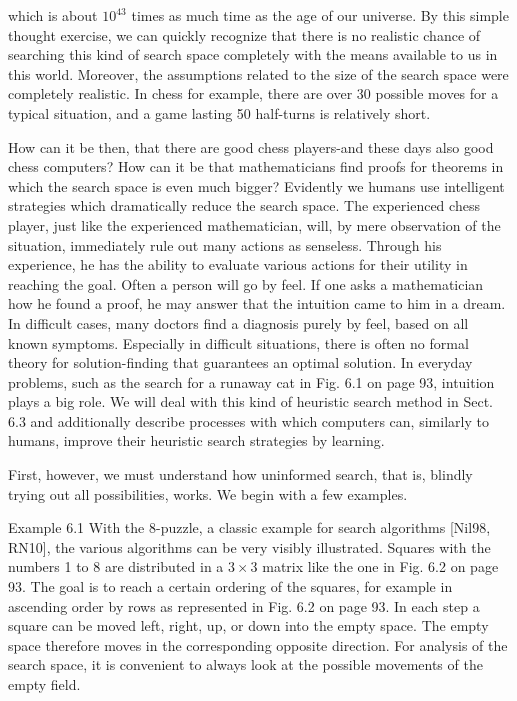 \documentclass[10pt]{article}
\begin{document}
which is about $10^{43}$ times as much time as the age of our universe. By this simple thought exercise, we can quickly recognize that there is no realistic chance of searching this kind of search space completely with the means available to us in this world. Moreover, the assumptions related to the size of the search space were completely realistic. In chess for example, there are over 30 possible moves for a typical situation, and a game lasting 50 half-turns is relatively short.

How can it be then, that there are good chess players-and these days also good chess computers? How can it be that mathematicians find proofs for theorems in which the search space is even much bigger? Evidently we humans use intelligent strategies which dramatically reduce the search space. The experienced chess player, just like the experienced mathematician, will, by mere observation of the situation, immediately rule out many actions as senseless. Through his experience, he has the ability to evaluate various actions for their utility in reaching the goal. Often a person will go by feel. If one asks a mathematician how he found a proof, he may answer that the intuition came to him in a dream. In difficult cases, many doctors find a diagnosis purely by feel, based on all known symptoms. Especially in difficult situations, there is often no formal theory for solution-finding that guarantees an optimal solution. In everyday problems, such as the search for a runaway cat in Fig. 6.1 on page 93, intuition plays a big role. We will deal with this kind of heuristic search method in Sect. 6.3 and additionally describe processes with which computers can, similarly to humans, improve their heuristic search strategies by learning.

First, however, we must understand how uninformed search, that is, blindly trying out all possibilities, works. We begin with a few examples.

Example 6.1 With the 8-puzzle, a classic example for search algorithms [Nil98, RN10], the various algorithms can be very visibly illustrated. Squares with the numbers 1 to 8 are distributed in a $3 \times 3$ matrix like the one in Fig. 6.2 on page 93. The goal is to reach a certain ordering of the squares, for example in ascending order by rows as represented in Fig. 6.2 on page 93. In each step a square can be moved left, right, up, or down into the empty space. The empty space therefore moves in the corresponding opposite direction. For analysis of the search space, it is convenient to always look at the possible movements of the empty field.
\end{document}
